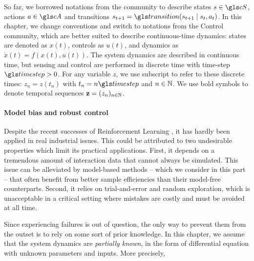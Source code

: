 \begin{remark}
\begin{leftbar}[remarkbar]
So far, we borrowed notations from the  community to describe states $s\in \cS$, actions $a\in\cA$ and transitions $s_{t+1} = \Ps\parentheses{s_{t+1}\mid s_t,a_t}$. In this chapter, we change conventions and switch to notations from the Control community, which are better suited to describe continuous-time dynamics: states are denoted as $x(t)$, controls as $u(t)$, and dynamics as $\dot{x}(t) = f(x(t), u(t))$. 
The system dynamics are described in continuous time, but sensing and control are performed in discrete time with time-step $\timestep>0$. For any variable $z$, we use subscript to refer to these discrete times: $z_n = z(t_n)$ with $t_n = n\timestep$ and $n\in\mathbb{N}$. We use bold symbols to denote temporal sequences $\mathbf{z} = (z_n)_{n\in\mathbb{N}}$.
\end{leftbar}
\end{remark}

\paragraph{Model bias and robust control}
Despite the recent successes of Reinforcement Learning \citep[e.g.][]{Mnih2015humanlevel,Silver2018}, it has hardly been applied in real industrial issues. This could be attributed to two undesirable properties which limit its practical applications. First, it depends on a tremendous amount of interaction data that cannot always be simulated. This issue can be alleviated by model-based methods -- which we consider in this part -- that often benefit from better sample efficiencies than their model-free counterparts. Second, it relies on trial-and-error and random exploration, which is unacceptable in a critical setting where mistakes are costly and must be avoided at all time.

Since experiencing failures is out of question, the only way to prevent them from the outset is to rely on some sort of prior knowledge. In this chapter, we assume that the system dynamics are \emph{partially known}, in the form of differential equation with unknown parameters and inputs. More precisely,

